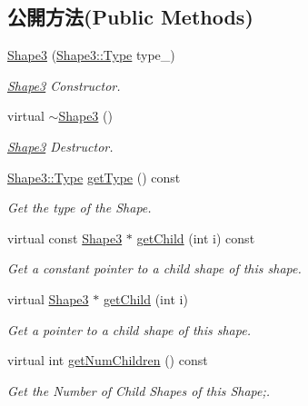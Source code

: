 \subsection*{公開方法(Public Methods)}
\begin{DoxyCompactItemize}
\item 
\hyperlink{class_magnum_1_1_shape3_aef288a7fbf23901161ddbd81f6d70191}{Shape3} (\hyperlink{class_magnum_1_1_shape3_ae6ddcdad31136c099bc210b3f6399ffb}{Shape3\+::\+Type} type\+\_\+)
\begin{DoxyCompactList}\small\item\em \hyperlink{class_magnum_1_1_shape3}{Shape3} Constructor. \end{DoxyCompactList}\item 
virtual \hyperlink{class_magnum_1_1_shape3_a71ac6166c20d81d6f2c0e64c8ea4a524}{$\sim$\+Shape3} ()
\begin{DoxyCompactList}\small\item\em \hyperlink{class_magnum_1_1_shape3}{Shape3} Destructor. \end{DoxyCompactList}\item 
\hyperlink{class_magnum_1_1_shape3_ae6ddcdad31136c099bc210b3f6399ffb}{Shape3\+::\+Type} \hyperlink{class_magnum_1_1_shape3_a5968a4ef166e399f5f0b7894666a94f2}{get\+Type} () const 
\begin{DoxyCompactList}\small\item\em Get the type of the Shape. \end{DoxyCompactList}\item 
virtual const \hyperlink{class_magnum_1_1_shape3}{Shape3} $\ast$ \hyperlink{class_magnum_1_1_shape3_ab751e951847254e02861cf8a3572e7bc}{get\+Child} (int i) const 
\begin{DoxyCompactList}\small\item\em Get a constant pointer to a child shape of this shape. \end{DoxyCompactList}\item 
virtual \hyperlink{class_magnum_1_1_shape3}{Shape3} $\ast$ \hyperlink{class_magnum_1_1_shape3_ae0b8c8c043c558486ecb24b4420cc71e}{get\+Child} (int i)
\begin{DoxyCompactList}\small\item\em Get a pointer to a child shape of this shape. \end{DoxyCompactList}\item 
virtual int \hyperlink{class_magnum_1_1_shape3_a9564c4fe471f1aca17f7419c4ef10ab6}{get\+Num\+Children} () const 
\begin{DoxyCompactList}\small\item\em Get the Number of Child Shapes of this Shape;. \end{DoxyCompactList}\item 

\end{DoxyCompactItemize}
